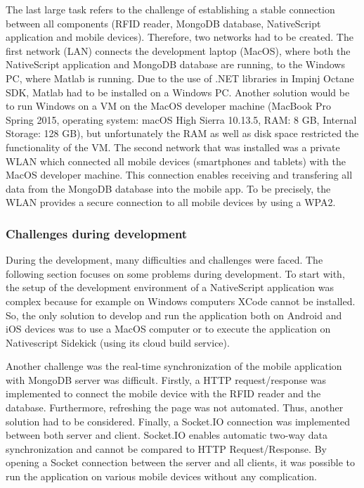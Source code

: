 The last large task refers to the challenge of establishing a stable connection between all components (RFID reader, MongoDB database, NativeScript application and mobile devices). Therefore, two networks had to be created. The first network (LAN) connects the development laptop (MacOS), where both the NativeScript application and MongoDB database are running, to the Windows PC, where Matlab is running. Due to the use of .NET libraries in Impinj Octane SDK, Matlab had to be installed on a Windows PC. Another solution would be to run Windows on a VM on the MacOS developer machine (MacBook Pro Spring 2015, operating system: macOS High Sierra 10.13.5, RAM: 8 GB, Internal Storage: 128 GB), but unfortunately the RAM as well as disk space restricted the functionality of the VM. The second network that was installed was a private WLAN which connected all mobile devices (smartphones and tablets) with the MacOS developer machine. This connection enables receiving and transfering all data from the MongoDB database into the mobile app. To be precisely, the WLAN provides a secure connection to all mobile devices by using a \ac{WPA2}.

\subsubsection{Challenges during development} \label{challenge}

During the development, many difficulties and challenges were faced. The following section focuses on some problems during development.
To start with, the setup of the development environment of a NativeScript application was complex because for example on Windows computers XCode cannot be installed. So, the only solution to develop and run the application both on Android and iOS devices was to use a MacOS computer or to execute the application on Nativescript Sidekick (using its cloud build service).  

Another challenge was the real-time synchronization of the mobile application with MongoDB server was difficult. Firstly, a HTTP request/response was implemented to connect the mobile device with the RFID reader and the database. Furthermore, refreshing the page was not automated. Thus, another solution had to be considered. Finally, a Socket.IO connection was implemented between both server and client. Socket.IO enables automatic two-way data synchronization and cannot be compared to HTTP Request/Response. By opening a Socket connection between the server and all clients, it was possible to run the application on various mobile devices without any complication. 

